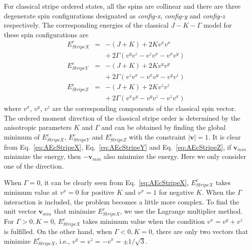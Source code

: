 \documentclass[aps,prb,reprint,amsfonts,amsmath,amssymb,showpacs,groupedaddress,superscriptaddress]{revtex4-1}
\begin{document}
For classical stripe ordered states, all the spins are collinear and there are three degenerate spin configurations designated as \emph{config-x}, \emph{config-y} and \emph{config-z} respectively. The corresponding energies of the classical $J-K-\Gamma$ model for these spin configurations are
\begin{subequations}
    \begin{eqnarray}
        E_{StripeX}^{c} & = & -(J + K) + 2 K v^x v^x \nonumber \\
            & & +\: 2 \Gamma (v^y v^z - v^z v^x - v^x v^y)
            \label{eq:AEcStripeX} \\
        E_{StripeY}^{c} & = & -(J + K) + 2 K v^y v^y \nonumber \\
            & & +\: 2 \Gamma (v^z v^x - v^x v^y - v^y v^z)
            \label{eq:AEcStripeY} \\
        E_{StripeZ}^{c} & = & -(J + K) + 2 K v^z v^z \nonumber \\
            & & +\: 2 \Gamma (v^x v^y - v^y v^z - v^z v^x)
            \label{eq:AEcStripeZ}
    \end{eqnarray}
\end{subequations}
where $v^x$, $v^y$, $v^z$ are the corresponding components of the classical spin vector. The ordered moment direction of the classical stripe order is determined by the anisotropic parameters $K$ and $\Gamma$ and can be obtained by finding the global minimum of $E_{StripeX}^{c}$, $E_{StripeY}^{c}$ and $E_{StripeZ}^{c}$ with the constraint $|\bm{v}|=1$. It is clear from Eq.~\eqref{eq:AEcStripeX}, Eq.~\eqref{eq:AEcStripeY} and Eq.~\eqref{eq:AEcStripeZ}, if $\bm{v}_{min}$ minimize the energy, then $-\bm{v}_{min}$ also minimize the energy. Here we only consider one of the direction.

When $\Gamma=0$, it can be clearly seen from Eq.~\eqref{eq:AEcStripeX}, $E_{StripeX}^c$ takes minimum value at $v^x=0$ for positive $K$ and $v^x=1$ for negative $K$. When the $\Gamma$ interaction is included, the problem becomes a little more complex. To find the unit vector $\bm{v}_{min}$ that minimize $E_{StripeX}^{c}$, we use the Lagrange multiplier method. For $\Gamma>0, K=0$, $E_{StripeX}^{c}$ takes minimum value when the condition $v^x=v^y+v^z$ is fulfilled. On the other hand, when $\Gamma<0, K=0$, there are only two vectors that minimize $E_{StripeX}^{c}$, i.e., $v^y=v^z=-v^x=\pm 1/\sqrt{3}$.
\end{document}
